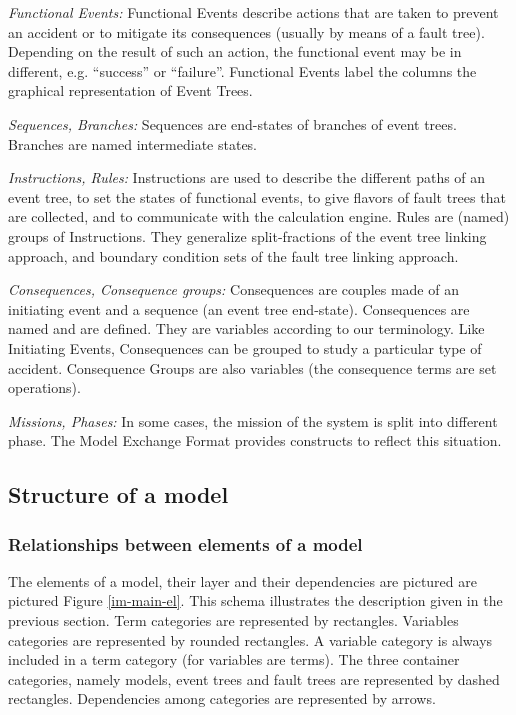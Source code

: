\documentclass[11pt]{article}
\begin{document}
\emph{Functional Events:} Functional Events describe actions that are taken
to prevent an accident or to mitigate its consequences (usually by means
of a fault tree). Depending on the result of such an action, the
functional event may be in different, e.g. ``success'' or ``failure''.
Functional Events label the columns the graphical representation of
Event Trees.

\emph{Sequences, Branches:} Sequences are end-states of branches of event
trees. Branches are named intermediate states.

\emph{Instructions, Rules:} Instructions are used to describe the different
paths of an event tree, to set the states of functional events, to give
flavors of fault trees that are collected, and to communicate with the
calculation engine. Rules are (named) groups of Instructions. They
generalize split-fractions of the event tree linking approach, and
boundary condition sets of the fault tree linking approach.

\emph{Consequences, Consequence groups:} Consequences are couples made of an
initiating event and a sequence (an event tree end-state). Consequences
are named and are defined. They are variables according to our
terminology. Like Initiating Events, Consequences can be grouped to
study a particular type of accident. Consequence Groups are also
variables (the consequence terms are set operations).

\emph{Missions, Phases:} In some cases, the mission of the system is split
into different phase. The Model Exchange Format provides constructs to
reflect this situation.

\subsection{Structure of a model}
\label{sec:org75063f9}



\subsubsection{Relationships between elements of a model}
\label{sec:org1f7f69d}

The elements of a model, their layer and their dependencies are pictured
are pictured Figure \ref{im-main-el}. This schema illustrates the description
given in the previous section. Term categories are represented by
rectangles. Variables categories are represented by rounded rectangles.
A variable category is always included in a term category (for variables
are terms). The three container categories, namely models, event trees
and fault trees are represented by dashed rectangles. Dependencies among
categories are represented by arrows.
\end{document}
